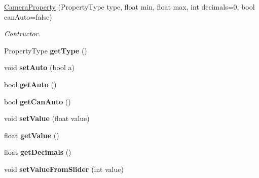 \begin{DoxyCompactItemize}
\item 
\hyperlink{class_camera_manager_1_1_camera_property_aad0857fede2af9835a8199171972db23}{Camera\-Property} (Property\-Type type, float min, float max, int decimals=0, bool can\-Auto=false)
\begin{DoxyCompactList}\small\item\em Contructor. \end{DoxyCompactList}\item 
\hypertarget{class_camera_manager_1_1_camera_property_abba29ee03832b7036f2d828223a5e26d}{Property\-Type {\bfseries get\-Type} ()}\label{class_camera_manager_1_1_camera_property_abba29ee03832b7036f2d828223a5e26d}

\item 
\hypertarget{class_camera_manager_1_1_camera_property_a3c86a53f13aff002234e1c2e7ba17e22}{void {\bfseries set\-Auto} (bool a)}\label{class_camera_manager_1_1_camera_property_a3c86a53f13aff002234e1c2e7ba17e22}

\item 
\hypertarget{class_camera_manager_1_1_camera_property_a09276d4af15cb3b6b282d75108eefc2c}{bool {\bfseries get\-Auto} ()}\label{class_camera_manager_1_1_camera_property_a09276d4af15cb3b6b282d75108eefc2c}

\item 
\hypertarget{class_camera_manager_1_1_camera_property_a79acdab6a37d6c8c07d2fc46cfee8067}{bool {\bfseries get\-Can\-Auto} ()}\label{class_camera_manager_1_1_camera_property_a79acdab6a37d6c8c07d2fc46cfee8067}

\item 
\hypertarget{class_camera_manager_1_1_camera_property_aabbcf30d6a190b57e87f9b5249a7614d}{void {\bfseries set\-Value} (float value)}\label{class_camera_manager_1_1_camera_property_aabbcf30d6a190b57e87f9b5249a7614d}

\item 
\hypertarget{class_camera_manager_1_1_camera_property_a17872df27362cca1a73455aedd894068}{float {\bfseries get\-Value} ()}\label{class_camera_manager_1_1_camera_property_a17872df27362cca1a73455aedd894068}

\item 
\hypertarget{class_camera_manager_1_1_camera_property_a58c15ba2b37a26641154740ebb2190f7}{float {\bfseries get\-Decimals} ()}\label{class_camera_manager_1_1_camera_property_a58c15ba2b37a26641154740ebb2190f7}

\item 
\hypertarget{class_camera_manager_1_1_camera_property_aebccd803702e01dbd9418b0ed4efba9a}{void {\bfseries set\-Value\-From\-Slider} (int value)}\label{class_camera_manager_1_1_camera_property_aebccd803702e01dbd9418b0ed4efba9a}


\end{DoxyCompactItemize}
